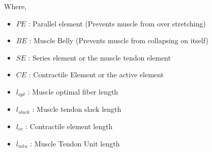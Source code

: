 \documentclass{cmc}
\begin{document}
Where,

\begin{itemize}
\item $PE$ : Parallel element (Prevents muscle from over stretching)
\item $BE$ : Muscle Belly (Prevents muscle from collapsing on itself)
\item $SE$ : Series element or the muscle tendon element
\item $CE$ : Contractile Element or the active element
\item $l_{opt}$ : Muscle optimal fiber length
\item $l_{slack}$ : Muscle tendon slack length
\item $l_{ce}$ : Contractile element length
\item $l_{mtu}$ : Muscle Tendon Unit length
\end{itemize}
\end{document}
